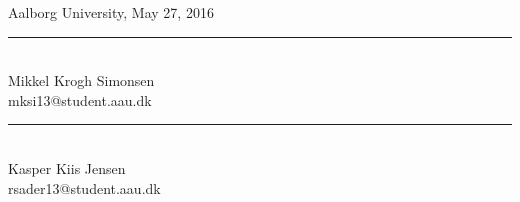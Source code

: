 \vspace{0.5\baselineskip}\hfill Aalborg University, May 27, 2016

\hspace{1.5\baselineskip}
\hspace{1.5\baselineskip}

\vspace{1.5\baselineskip}

\begin{minipage}[b]{0.45\textwidth}
 \centering
 \rule{\textwidth}{0.45pt}\\
  Mikkel Krogh Simonsen\\
 {\footnotesize mksi13@student.aau.dk}
\end{minipage}
\vspace{1.5\baselineskip}
\hfill
\begin{minipage}[b]{0.45\textwidth}
 \centering
 \rule{\textwidth}{0.45pt}\\
  Kasper Kiis Jensen\\
 {\footnotesize rsader13@student.aau.dk}
\end{minipage}

